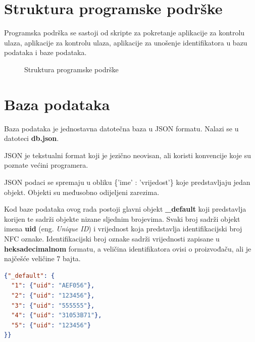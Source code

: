 \documentclass[times, utf8, zavrsni]{fer}
\begin{document}
\section{Struktura programske podrške}
Programska podrška se sastoji od skripte za pokretanje aplikacije za kontrolu ulaza, aplikacije za kontrolu ulaza, aplikacije za unošenje identifikatora u bazu podataka i baze podataka.
\begin{figure}[h]
\caption{Struktura programske podrške}
\end{figure}

\section{Baza podataka}
Baza podataka je jednostavna datotečna baza u JSON formatu. Nalazi se u datoteci \textbf{db.json}.	\par
JSON je tekstualni format koji je jezično neovisan, ali koristi konvencije koje su poznate većini programera.\par
JSON podaci se spremaju u obliku \{'ime' : 'vrijedost'\} koje predstavljaju jedan objekt. Objekti su međusobno odijeljeni zarezima.\par 
Kod baze podataka ovog rada postoji glavni objekt \textbf{\_default} koji predstavlja korijen te sadrži objekte nizane   sljednim brojevima. Svaki broj sadrži objekt imena \textbf{uid} (eng. \textit{Unique ID}) i vrijednost koja predstavlja identifikacijski broj NFC oznake. Identifikacijski broj oznake sadrži vrijednosti zapisane u \textbf{heksadecimalnom} formatu, a veličina identifikatora ovisi o proizvođaču, ali je najčešće veličine 7 bajta.

\begin{lstlisting}[language=json,firstnumber=1]
{"_default": {
  "1": {"uid": "AEF056"}, 
  "2": {"uid": "123456"},
  "3": {"uid": "555555"},
  "4": {"uid": "31053B71"},
  "5": {"uid": "123456"}
}}

\end{lstlisting}
\end{document}
